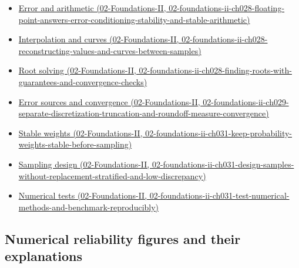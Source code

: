 \begin{itemize}
\tightlist
\item
  \href{../02-Foundations-II/main.pdf\#nameddest=02-foundations-ii-ch028-floating-point-answers-error-conditioning-stability-and-stable-arithmetic}{Error and arithmetic (02-Foundations-II, 02-foundations-ii-ch028-floating-point-answers-error-conditioning-stability-and-stable-arithmetic)}
\item
  \href{../02-Foundations-II/main.pdf\#nameddest=02-foundations-ii-ch028-reconstructing-values-and-curves-between-samples}{Interpolation and curves (02-Foundations-II, 02-foundations-ii-ch028-reconstructing-values-and-curves-between-samples)}
\item
  \href{../02-Foundations-II/main.pdf\#nameddest=02-foundations-ii-ch028-finding-roots-with-guarantees-and-convergence-checks}{Root solving (02-Foundations-II, 02-foundations-ii-ch028-finding-roots-with-guarantees-and-convergence-checks)}
\item
  \href{../02-Foundations-II/main.pdf\#nameddest=02-foundations-ii-ch029-separate-discretization-truncation-and-roundoff-measure-convergence}{Error sources and convergence (02-Foundations-II, 02-foundations-ii-ch029-separate-discretization-truncation-and-roundoff-measure-convergence)}
\item
  \href{../02-Foundations-II/main.pdf\#nameddest=02-foundations-ii-ch031-keep-probability-weights-stable-before-sampling}{Stable weights (02-Foundations-II, 02-foundations-ii-ch031-keep-probability-weights-stable-before-sampling)}
\item
  \href{../02-Foundations-II/main.pdf\#nameddest=02-foundations-ii-ch031-design-samples-without-replacement-stratified-and-low-discrepancy}{Sampling design (02-Foundations-II, 02-foundations-ii-ch031-design-samples-without-replacement-stratified-and-low-discrepancy)}
\item
  \href{../02-Foundations-II/main.pdf\#nameddest=02-foundations-ii-ch031-test-numerical-methods-and-benchmark-reproducibly}{Numerical tests (02-Foundations-II, 02-foundations-ii-ch031-test-numerical-methods-and-benchmark-reproducibly)}
\end{itemize}

\subsection{Numerical reliability figures and their explanations}\label{appendix-cb5af353ef77-numerical-reliability-figures-and-their-explanations}

